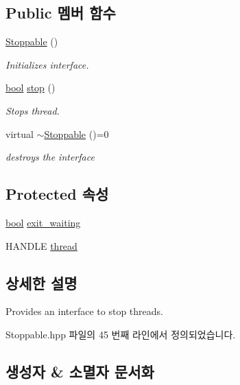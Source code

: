 \subsection*{Public 멤버 함수}
\begin{DoxyCompactItemize}
\item 
\hyperlink{class_stoppable_a4231ee897c0c01236103510158bb1b25}{Stoppable} ()
\begin{DoxyCompactList}\small\item\em Initializes interface. \end{DoxyCompactList}\item 
\hyperlink{avb__gptp_8h_af6a258d8f3ee5206d682d799316314b1}{bool} \hyperlink{class_stoppable_a68a350717fe6bf9012843e7c977d87b2}{stop} ()
\begin{DoxyCompactList}\small\item\em Stops thread. \end{DoxyCompactList}\item 
virtual \hyperlink{class_stoppable_a36556fcc5808e31d531cf08cceaae892}{$\sim$\+Stoppable} ()=0
\begin{DoxyCompactList}\small\item\em destroys the interface \end{DoxyCompactList}\end{DoxyCompactItemize}
\subsection*{Protected 속성}
\begin{DoxyCompactItemize}
\item 
\hyperlink{avb__gptp_8h_af6a258d8f3ee5206d682d799316314b1}{bool} \hyperlink{class_stoppable_ae0c3c0996c39797d309663cd3a2633d3}{exit\+\_\+waiting}
\item 
H\+A\+N\+D\+LE \hyperlink{class_stoppable_adf8b62c27edd1f6b7641bb7bb7f60275}{thread}
\end{DoxyCompactItemize}


\subsection{상세한 설명}
Provides an interface to stop threads. 

Stoppable.\+hpp 파일의 45 번째 라인에서 정의되었습니다.



\subsection{생성자 \& 소멸자 문서화}
